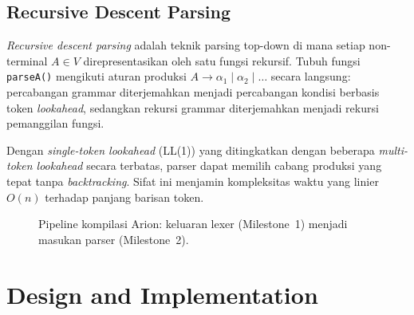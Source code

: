 \documentclass[11pt,a4paper]{article}
\begin{document}
\subsection{Recursive Descent Parsing}

\textit{Recursive descent parsing} adalah teknik parsing top-down di mana setiap
non-terminal $A \in V$ direpresentasikan oleh satu fungsi rekursif. Tubuh fungsi
\texttt{parseA()} mengikuti aturan produksi $A \to \alpha_1 \mid \alpha_2 \mid \dots$
secara langsung: percabangan grammar diterjemahkan menjadi percabangan kondisi
berbasis token \textit{lookahead}, sedangkan rekursi grammar diterjemahkan menjadi
rekursi pemanggilan fungsi.

Dengan \textit{single-token lookahead} (LL(1)) yang ditingkatkan dengan beberapa
\textit{multi-token lookahead} secara terbatas, parser dapat memilih cabang produksi
yang tepat tanpa \textit{backtracking}. Sifat ini menjamin kompleksitas waktu yang
linier $O(n)$ terhadap panjang barisan token.

\begin{figure}[H]
\centering
{}
\caption{Pipeline kompilasi Arion: keluaran lexer (Milestone~1) menjadi masukan parser (Milestone~2).}
\label{fig:pipeline}
\end{figure}

\section{Design and Implementation}
\end{document}
